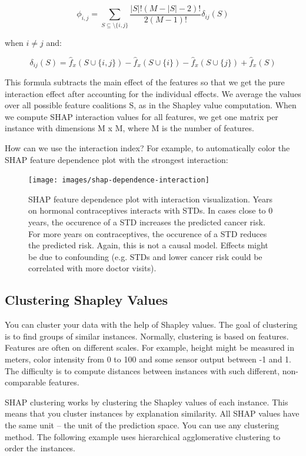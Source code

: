 \documentclass[
  10pt,
]{scrbook}
\begin{document}
\[\phi_{i,j}=\sum_{S\subseteq\setminus\{i,j\}}\frac{|S|!(M-|S|-2)!}{2(M-1)!}\delta_{ij}(S)\]

when \(i\neq{}j\) and:

\[\delta_{ij}(S)=\hat{f}_x(S\cup\{i,j\})-\hat{f}_x(S\cup\{i\})-\hat{f}_x(S\cup\{j\})+\hat{f}_x(S)\]

This formula subtracts the main effect of the features so that we get the pure interaction effect after accounting for the individual effects.
We average the values over all possible feature coalitions S, as in the Shapley value computation.
When we compute SHAP interaction values for all features, we get one matrix per instance with dimensions M x M, where M is the number of features.

How can we use the interaction index?
For example, to automatically color the SHAP feature dependence plot with the strongest interaction:

\begin{figure}

{\centering \texttt{[image: images/shap-dependence-interaction]} 

}

\caption{SHAP feature dependence plot with interaction visualization. Years on hormonal contraceptives interacts with STDs. In cases close to 0 years, the occurence of a STD increases the predicted cancer risk. For more years on contraceptives, the occurence of a STD reduces the predicted risk. Again, this is not a causal model. Effects might be due to confounding (e.g. STDs and lower cancer risk could be correlated with more doctor visits).}\label{fig:unnamed-chunk-48}
\end{figure}

\hypertarget{clustering-shapley-values}{%
\subsection{Clustering Shapley Values}\label{clustering-shapley-values}}

You can cluster your data with the help of Shapley values.
The goal of clustering is to find groups of similar instances.
Normally, clustering is based on features.
Features are often on different scales.
For example, height might be measured in meters, color intensity from 0 to 100 and some sensor output between -1 and 1.
The difficulty is to compute distances between instances with such different, non-comparable features.

SHAP clustering works by clustering the Shapley values of each instance.
This means that you cluster instances by explanation similarity.
All SHAP values have the same unit -- the unit of the prediction space.
You can use any clustering method.
The following example uses hierarchical agglomerative clustering to order the instances.
\end{document}
